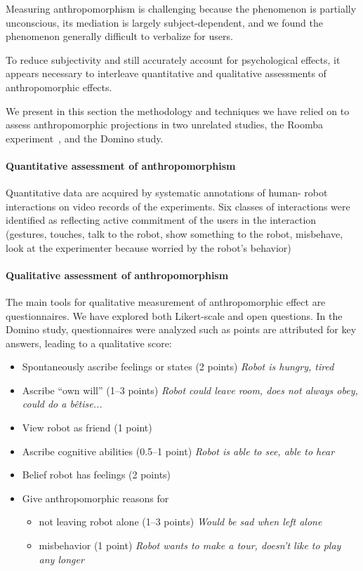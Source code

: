 \documentclass{frontiersSCNS} %
\begin{document}
Measuring anthropomorphism is challenging because the phenomenon is partially
unconscious, its mediation is largely subject-dependent, and we found the
phenomenon generally difficult to verbalize for users.

To reduce subjectivity and still accurately account for psychological effects,
it appears necessary to interleave quantitative and qualitative assessments of
anthropomorphic effects.

We present in this section the methodology and techniques we have relied on to
assess anthropomorphic projections in two unrelated studies, the Roomba
experiment~\cite{fink_living_2013}, and the Domino study.

\paragraph{Quantitative assessment of anthropomorphism} Quantitative data are
acquired by systematic annotations of human- robot interactions on video records
of the experiments. Six classes of interactions were identified as reflecting
active commitment of the users in the interaction (gestures, touches, talk to
the robot, show something to the robot, misbehave, look at the experimenter
because worried by the robot's behavior)

\paragraph{Qualitative assessment of anthropomorphism} The main tools for
qualitative measurement of anthropomorphic effect are questionnaires. We have
explored both Likert-scale and open questions. In the Domino study,
questionnaires were analyzed such as points are attributed for key answers,
leading to a qualitative score:

\begin{itemize}
    \item Spontaneously ascribe feelings or states (2 points) {\it Robot is
        hungry, tired}
    \item Ascribe ``own will'' (1--3 points) {\it Robot could leave room, does not
        always obey, could do a b\^{e}tise...}
    \item View robot as friend (1 point)
    \item Ascribe cognitive abilities (0.5--1 point) {\it Robot is able to see,
        able to hear}
    \item Belief robot has feelings (2 points)
    \item Give anthropomorphic reasons for
        \begin{itemize}
            \item not leaving robot alone (1--3 points) {\it Would be sad when
                left alone}
            \item misbehavior (1 point) {\it Robot wants to make a tour, doesn't
                like to play any longer}
        \end{itemize}
\end{itemize}
\end{document}
